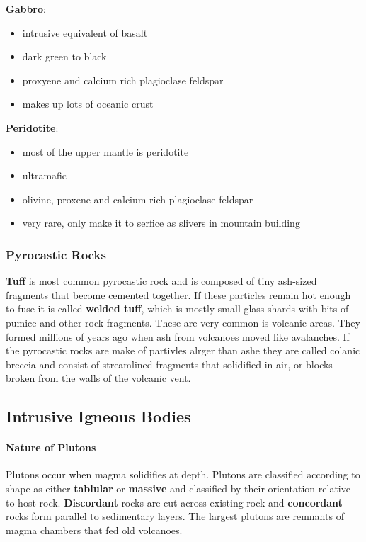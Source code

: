 \documentclass{article}
\begin{document}
\textbf{Gabbro}:
\begin{itemize}
    \item intrusive equivalent of basalt
    \item dark green to black
    \item proxyene and calcium rich plagioclase feldspar
    \item makes up lots of oceanic crust
\end{itemize}

\textbf{Peridotite}:
\begin{itemize}
    \item most of the upper mantle is peridotite
    \item ultramafic
    \item olivine, proxene and calcium-rich plagioclase feldspar
    \item very rare, only make it to serfice as slivers in mountain building
\end{itemize}

\subsubsection*{Pyrocastic Rocks} %
\label{subsub:pyrocastic_rocks}
\textbf{Tuff} is most common pyrocastic rock and is composed of tiny ash-sized fragments that become cemented together. If these particles remain hot enough to fuse it is called \textbf{welded tuff}, which is mostly small glass shards with bits of pumice and other rock fragments. These are very common is volcanic areas. They formed millions of years ago when ash from volcanoes moved like avalanches. If the pyrocastic rocks are make of partivles alrger than ashe they are called colanic breccia and consist of streamlined fragments that solidified in air, or blocks broken from the walls of the volcanic vent.


\subsection*{Intrusive Igneous Bodies} %
\label{sub:intrusive_igneous_bodies}
\paragraph{Nature of Plutons} %
\label{par:nature_of_plutons}
Plutons occur when magma solidifies at depth. Plutons are classified according to shape as either \textbf{tablular} or \textbf{massive} and classified by their orientation relative to host rock. \textbf{Discordant} rocks are cut across existing rock and \textbf{concordant} rocks form parallel to sedimentary layers. The largest plutons are remnants of magma chambers that fed old volcanoes.
\end{document}
